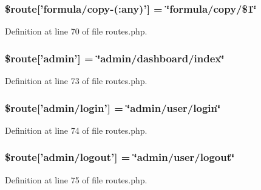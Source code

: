\hypertarget{routes_8php_aa99a1d50e0b0be556af56803c6e95925}{
\subsubsection[{\$route}]{\setlength{\rightskip}{0pt plus 5cm}\$route\mbox{[}'formula/copy-\/(\-:any)'\mbox{]} = \char`\"{}formula/copy/\$1\char`\"{}}}\label{routes_8php_aa99a1d50e0b0be556af56803c6e95925}


Definition at line 70 of file routes.\-php.

\hypertarget{routes_8php_a740e1be77b5d698dffaec236d905a70f}{
\subsubsection[{\$route}]{\setlength{\rightskip}{0pt plus 5cm}\$route\mbox{[}'admin'\mbox{]} = \char`\"{}admin/dashboard/index\char`\"{}}}\label{routes_8php_a740e1be77b5d698dffaec236d905a70f}


Definition at line 73 of file routes.\-php.

\hypertarget{routes_8php_ac26b3cf61c58be1c9310292a1e1635b4}{
\subsubsection[{\$route}]{\setlength{\rightskip}{0pt plus 5cm}\$route\mbox{[}'admin/login'\mbox{]} = \char`\"{}admin/user/login\char`\"{}}}\label{routes_8php_ac26b3cf61c58be1c9310292a1e1635b4}


Definition at line 74 of file routes.\-php.

\hypertarget{routes_8php_a7d9acf4789728cb04aa567b32c77e277}{
\subsubsection[{\$route}]{\setlength{\rightskip}{0pt plus 5cm}\$route\mbox{[}'admin/logout'\mbox{]} = \char`\"{}admin/user/logout\char`\"{}}}\label{routes_8php_a7d9acf4789728cb04aa567b32c77e277}


Definition at line 75 of file routes.\-php.

